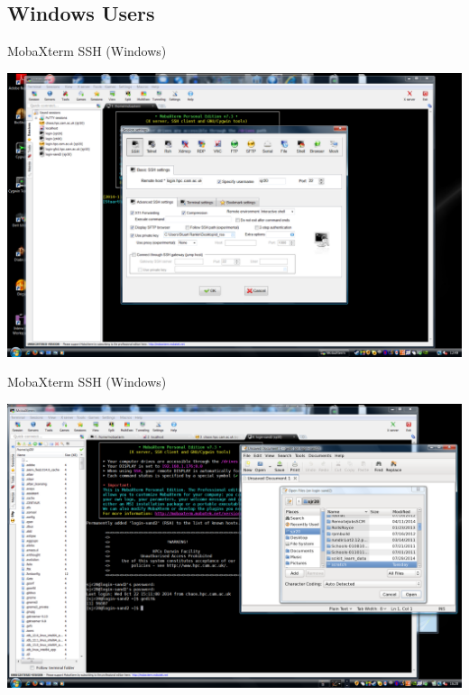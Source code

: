 \subsection{Windows Users}
\begin{frame}{MobaXterm SSH (Windows)}
\begin{center}
\centerline{\includegraphics[height=0.8\textheight]{imgs/mobaxterm-SSH-settings2.png}}
\end{center}
\end{frame}

\begin{frame}{MobaXterm SSH (Windows)}
\begin{center}
\centerline{\includegraphics[height=0.8\textheight]{imgs/mobaxterm-SSH-session.png}}
\end{center}
\end{frame}